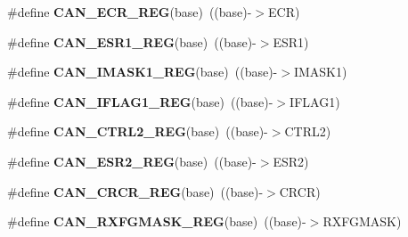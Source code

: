 \begin{DoxyCompactItemize}
\item 
\#define {\bfseries C\+A\+N\+\_\+\+E\+C\+R\+\_\+\+R\+EG}(base)~((base)-\/$>$E\+CR)\hypertarget{group__CAN__Register__Accessor__Macros_ga9ecb0d114e3a4a5f5e7de0c4071f8e09}{}\label{group__CAN__Register__Accessor__Macros_ga9ecb0d114e3a4a5f5e7de0c4071f8e09}

\item 
\#define {\bfseries C\+A\+N\+\_\+\+E\+S\+R1\+\_\+\+R\+EG}(base)~((base)-\/$>$E\+S\+R1)\hypertarget{group__CAN__Register__Accessor__Macros_gacace34b428b6078b131eef38e89399b8}{}\label{group__CAN__Register__Accessor__Macros_gacace34b428b6078b131eef38e89399b8}

\item 
\#define {\bfseries C\+A\+N\+\_\+\+I\+M\+A\+S\+K1\+\_\+\+R\+EG}(base)~((base)-\/$>$I\+M\+A\+S\+K1)\hypertarget{group__CAN__Register__Accessor__Macros_gac1c652fcb64287bcac74fe68ba37e841}{}\label{group__CAN__Register__Accessor__Macros_gac1c652fcb64287bcac74fe68ba37e841}

\item 
\#define {\bfseries C\+A\+N\+\_\+\+I\+F\+L\+A\+G1\+\_\+\+R\+EG}(base)~((base)-\/$>$I\+F\+L\+A\+G1)\hypertarget{group__CAN__Register__Accessor__Macros_gaf123350c900ffdd62905693b7cbf0a84}{}\label{group__CAN__Register__Accessor__Macros_gaf123350c900ffdd62905693b7cbf0a84}

\item 
\#define {\bfseries C\+A\+N\+\_\+\+C\+T\+R\+L2\+\_\+\+R\+EG}(base)~((base)-\/$>$C\+T\+R\+L2)\hypertarget{group__CAN__Register__Accessor__Macros_ga252e9179119410fbab775da88dbbcff6}{}\label{group__CAN__Register__Accessor__Macros_ga252e9179119410fbab775da88dbbcff6}

\item 
\#define {\bfseries C\+A\+N\+\_\+\+E\+S\+R2\+\_\+\+R\+EG}(base)~((base)-\/$>$E\+S\+R2)\hypertarget{group__CAN__Register__Accessor__Macros_gad3298babfd7b15e542b3d5fefca3c98e}{}\label{group__CAN__Register__Accessor__Macros_gad3298babfd7b15e542b3d5fefca3c98e}

\item 
\#define {\bfseries C\+A\+N\+\_\+\+C\+R\+C\+R\+\_\+\+R\+EG}(base)~((base)-\/$>$C\+R\+CR)\hypertarget{group__CAN__Register__Accessor__Macros_gaf0fb93bc80a71b8fa9087d18c7503186}{}\label{group__CAN__Register__Accessor__Macros_gaf0fb93bc80a71b8fa9087d18c7503186}

\item 
\#define {\bfseries C\+A\+N\+\_\+\+R\+X\+F\+G\+M\+A\+S\+K\+\_\+\+R\+EG}(base)~((base)-\/$>$R\+X\+F\+G\+M\+A\+SK)\hypertarget{group__CAN__Register__Accessor__Macros_ga7a5e529487aea1806a00f328ae0ec06c}{}\label{group__CAN__Register__Accessor__Macros_ga7a5e529487aea1806a00f328ae0ec06c}


\end{DoxyCompactItemize}
